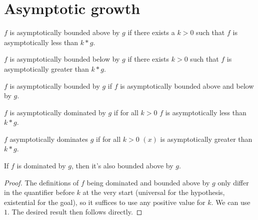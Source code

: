 \chapter{Asymptotic growth}

\begin{definition}
    \label{def:asymp_bounded_above}
    \leanok
    $f$ is asymptotically bounded above by $g$ if there exists a $k > 0$ 
    such that $f$ is asymptotically less than $k*g$.
\end{definition}

\begin{definition}
    \label{def:asymp_bounded_below}
    \leanok
    $f$ is asymptotically bounded below by $g$ if there exists $k > 0$ 
    such that $f$ is asymptotically greater than $k*g$.
\end{definition}

\begin{definition}
    \label{def:asymp_bounded}
    \leanok
    $f$ is asymptotically bounded by $g$ if $f$ is asymptotically bounded
    above and below by $g$.
\end{definition}

\begin{definition}
    \label{def:asymp_right_dom}
    \leanok
    $f$ is asymptotically dominated by $g$ if for all $k > 0$ $f$ is asymptotically 
    less than $k*g$.

\end{definition}

\begin{definition}
    \label{def:asymp_left_dom}
    \leanok
    $f$ asymptotically dominates $g$ if for all $k > 0$ $(x)$ is asymptotically
    greater than $k*g$.

\end{definition}

\begin{lemma}
    \label{lemma:asymp_bounded_above_of_right_dom}
    \leanok
    If $f$ is dominated by $g$, then it's also bounded above by $g$.
\end{lemma}

\begin{proof}
    \leanok 
    The definitions of $f$ being dominated and bounded above by $g$ only differ
    in the quantifier before $k$ at the very start (universal for the hypothesis, existential
    for the goal), so it suffices to use any positive value for $k$. We can use $1$. 
    The desired result then follows directly.
\end{proof}

